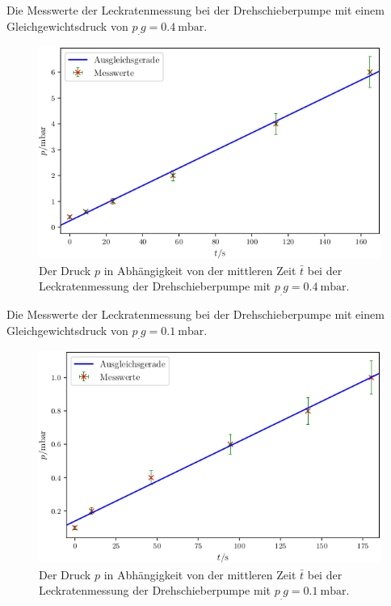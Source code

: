 \begin{table}
\centering
\caption{Die Messwerte der Leckratenmessung bei der Drehschieberpumpe mit einem Gleichgewichtsdruck von $p_.g = \SI{0.4}{\milli\bar}$.}

\label{tab:DL3}
\end{table}

\begin{figure}
\centering
\includegraphics[width=\linewidth-70pt,height=\textheight-70pt,keepaspectratio]{content/images/DL3.png}
\caption{Der Druck $p$ in Abhängigkeit von der mittleren Zeit $\bar{t}$ bei der Leckratenmessung der Drehschieberpumpe  mit $p_.g = \SI{0.4}{\milli\bar}$.}
\label{fig:DL3}
\end{figure}

\begin{table}
\centering
\caption{Die Messwerte der Leckratenmessung bei der Drehschieberpumpe mit einem Gleichgewichtsdruck von $p_.g = \SI{0.1}{\milli\bar}$.}

\label{tab:DL4}
\end{table}

\begin{figure}
\centering
\includegraphics[width=\linewidth-70pt,height=\textheight-70pt,keepaspectratio]{content/images/DL4.png}
\caption{Der Druck $p$ in Abhängigkeit von der mittleren Zeit $\bar{t}$ bei der Leckratenmessung der Drehschieberpumpe  mit $p_.g = \SI{0.1}{\milli\bar}$.}
\label{fig:DL4}
\end{figure}

